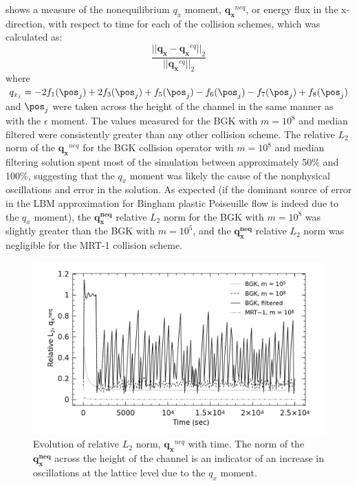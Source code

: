  shows a measure of the nonequilibrium $q_x$ moment, $\mathbf{q_x}^{neq}$, or energy flux in the x-direction, with respect to time for each of the collision schemes, which was calculated as:
\begin{equation}
    \frac{||\mathbf{q_x} - \mathbf{q_x}^{eq}||_2}{||\mathbf{q_x}^{eq}||_2}
\end{equation}
\noindent where $q_{x_j} = - 2f_1(\pos_j) + 2f_3(\pos_j) + f_5(\pos_j) - f_6(\pos_j) - f_7(\pos_j) + f_8(\pos_j)$ and $\pos_j$ were taken across the height of the channel in the same manner as with the $\epsilon$ moment.
The values measured for the BGK with $m = 10^8$ and median filtered were consistently greater than any other collision scheme.
The relative $L_2$ norm of the $\mathbf{q_x}^{neq}$ for the BGK collision operator with $m = 10^8$ and median filtering solution spent most of the simulation between approximately 50\% and 100\%, suggesting that the $q_x$ moment was likely the cause of the nonphysical oscillations and error in the solution.
As expected (if the dominant source of error in the LBM approximation for Bingham plastic Poiseuille flow is indeed due to the $q_x$ moment), the $\mathbf{q_x^{neq}}$ relative $L_2$ norm for the BGK with $m = 10^8$ was slightly greater than the BGK with $m = 10^5$, and the $\mathbf{q_x^{neq}}$ relative $L_2$ norm was negligible for the MRT-1 collision scheme.

\begin{figure}
	\centering
    \includegraphics[width=\linewidth]{figs/poise-bingham/qx}
    \caption{Evolution of relative $L_2$ norm, $\mathbf{q_x}^{neq}$ with time. The norm of the $\mathbf{q_x^{neq}}$ across the height of the channel is an indicator of an increase in oscillations at the lattice level due to the $q_x$ moment.}
    \label{fig:qx}
\end{figure}

